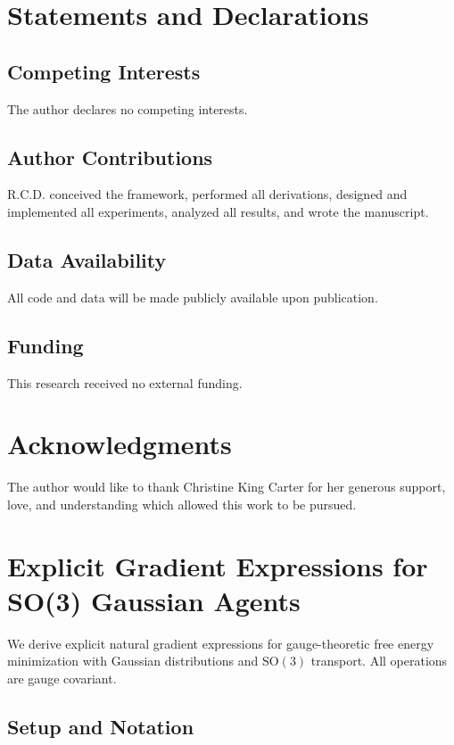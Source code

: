 \documentclass[11pt]{article}
\newenvironment{acknowledgments}{\section*{Acknowledgments}}{}
\begin{document}
\section*{Statements and Declarations}

\subsection*{Competing Interests}
The author declares no competing interests.

\subsection*{Author Contributions}
R.C.D. conceived the framework, performed all derivations, designed and implemented all experiments, analyzed all results, and wrote the manuscript.

\subsection*{Data Availability}
All code and data will be made publicly available upon publication.

\subsection*{Funding}
This research received no external funding.

\begin{acknowledgments}
The author would like to thank Christine King Carter for her generous support, love, and understanding which allowed this work to be pursued.
\end{acknowledgments}

\appendix

\section{Explicit Gradient Expressions for SO(3) Gaussian Agents}
\label{app:gradients}

We derive explicit natural gradient expressions for gauge-theoretic free energy minimization with Gaussian distributions and $\mathrm{SO}(3)$ transport. All operations are gauge covariant.

\subsection*{Setup and Notation}
\end{document}
